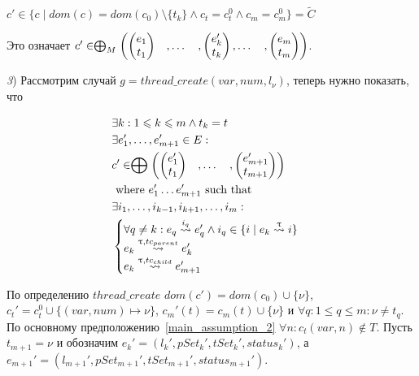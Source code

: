 $c' \in \{c \mid dom(c) = dom(c_0) \setminus \{t_k\} \land c_t = c^0_{t} \land c_m = c^0_m\} = \tilde{C}$

Это означает $c' \in \mathrel{\bigoplus}_M
\begin{pmatrix}
\begin{pmatrix}
e_1 \\
t_1 
\end{pmatrix}& ,
\dots& ,
\begin{pmatrix}
e_k' \\
t_k 
\end{pmatrix},
\dots& ,
\begin{pmatrix}
e_m \\
t_m 
\end{pmatrix}
\end{pmatrix}$.

{\textit 3)} Рассмотрим случай $g = thread\_create(var, num, l_\nu)$, теперь нужно показать, что

\begin{align}
& \exists k : 1 \leqslant k \leqslant m \land t_k = t \nonumber \\
& \exists e_1', \dots, e_{m+1}' \in E: \nonumber \\
& c' \in \mathrel{\bigoplus}
\begin{pmatrix}
\begin{pmatrix}
e_1' \\
t_1 
\end{pmatrix}& ,
\dots& ,
\begin{pmatrix}
e_{m+1}' \\
t_{m+1} 
\end{pmatrix}
\end{pmatrix} \nonumber \\
& \mbox{ where } e_1' \dots e_{m+1}' \mbox{ such that } \nonumber \\
&\exists i_1, \dots, i_{k-1}, i_{k+1}, \dots, i_m: \nonumber \\
&
\begin{cases}
\forall q \neq k: e_q \stackrel{i_q}{\leadsto} e_q' \land i_q \in \{i \mid e_k \stackrel{\uptau}{\leadsto} i\} \\
e_k \stackrel{\uptau, tc_{parent}}{\leadsto} e_k' \\
e_k \stackrel{\uptau, tc_{child}}{\leadsto} e_{m+1}'
\end{cases} \nonumber 
\end{align}

По определению $thread\_create$ 
$dom(c') = dom(c_0) \cup \{\nu\}$, $c_t' = c^0_t \cup \{(var, num) \mapsto \nu\}$, $c_m'(t) = c_m(t) \cup \{\nu\}$ и
$\forall q: 1\le q\le m: \nu \ne t_q$.
По основному предположению~\ref{main_assumption_2} 
$\forall n: c_t(var, n) \notin T$.
Пусть $t_{m+1} = \nu$ и обозначим $e_k' = (l_k', pSet_k', tSet_k', status_k')$, а $e_{m+1}' = (l_{m+1}', pSet_{m+1}', tSet_{m+1}', status_{m+1}')$.

